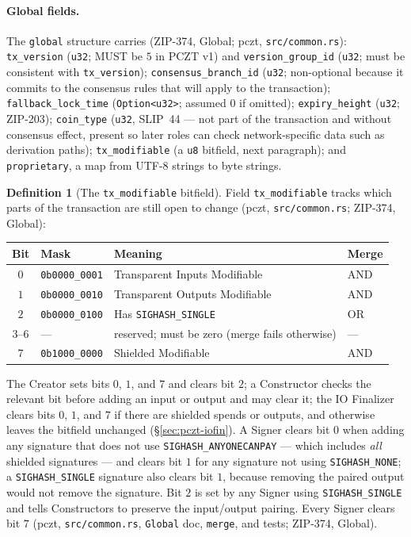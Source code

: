 \documentclass[11pt,a4paper]{article}
\theoremstyle{definition}
\newtheorem{definition}[theorem]{Definition}
\begin{document}
\paragraph{Global fields.} The \texttt{global} structure carries
(ZIP-374, Global; \textsf{pczt}, \texttt{src/common.rs}):
\texttt{tx\_version} (\texttt{u32}; MUST be $5$ in PCZT v1) and
\texttt{version\_group\_id} (\texttt{u32}; must be consistent with
\texttt{tx\_version}); \texttt{consensus\_branch\_id} (\texttt{u32};
non-optional because it commits to the consensus rules that will apply to
the transaction); \texttt{fallback\_lock\_time}
(\texttt{Option<u32>}; assumed $0$ if omitted);
\texttt{expiry\_height} (\texttt{u32}; ZIP-203); \texttt{coin\_type}
(\texttt{u32}, SLIP~44 --- not part of the transaction and without
consensus effect, present so later roles can check network-specific data
such as derivation paths); \texttt{tx\_modifiable} (a \texttt{u8}
bitfield, next paragraph); and \texttt{proprietary}, a map from UTF-8
strings to byte strings.

\begin{definition}[The \texttt{tx\_modifiable} bitfield]%
\label{def:pczt-txmod}
Field \texttt{tx\_modifiable} tracks which parts of the transaction are
still open to change (\textsf{pczt}, \texttt{src/common.rs}; ZIP-374,
Global):

\begin{center}\small
\begin{tabular}{@{}clll@{}}
\toprule
Bit & Mask & Meaning & Merge \\
\midrule
$0$ & \texttt{0b0000\_0001} & Transparent Inputs Modifiable  & AND \\
$1$ & \texttt{0b0000\_0010} & Transparent Outputs Modifiable & AND \\
$2$ & \texttt{0b0000\_0100} & Has \texttt{SIGHASH\_SINGLE}   & OR  \\
$3$--$6$ & --- & reserved; must be zero (merge fails otherwise) & --- \\
$7$ & \texttt{0b1000\_0000} & Shielded Modifiable            & AND \\
\bottomrule
\end{tabular}
\end{center}

The Creator sets bits $0$, $1$, and $7$ and clears bit $2$; a Constructor
checks the relevant bit before adding an input or output and may clear it;
the IO Finalizer clears bits $0$, $1$, and $7$ if there are shielded
spends or outputs, and otherwise leaves the bitfield unchanged
(\S\ref{sec:pczt-iofin}). A Signer clears bit $0$ when adding
any signature that does not use \texttt{SIGHASH\_ANYONECANPAY} --- which
includes \emph{all} shielded signatures --- and clears bit $1$ for any
signature not using \texttt{SIGHASH\_NONE}; a \texttt{SIGHASH\_SINGLE}
signature also clears bit $1$, because removing the paired output would
not remove the signature. Bit $2$ is set by any Signer using
\texttt{SIGHASH\_SINGLE} and tells Constructors to preserve the
input/output pairing. Every Signer clears bit $7$ (\textsf{pczt},
\texttt{src/common.rs}, \texttt{Global} doc, \texttt{merge}, and tests;
ZIP-374, Global).
\end{definition}
\end{document}
